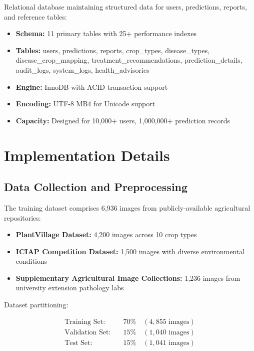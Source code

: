 \documentclass[conference]{IEEEtran}
\begin{document}
Relational database maintaining structured data for users, predictions, reports, and reference tables:

\begin{itemize}
\item \textbf{Schema:} 11 primary tables with 25+ performance indexes
\item \textbf{Tables:} users, predictions, reports, crop\_types, disease\_types, disease\_crop\_mapping, treatment\_recommendations, prediction\_details, audit\_logs, system\_logs, health\_advisories
\item \textbf{Engine:} InnoDB with ACID transaction support
\item \textbf{Encoding:} UTF-8 MB4 for Unicode support
\item \textbf{Capacity:} Designed for 10,000+ users, 1,000,000+ prediction records
\end{itemize}

\section{Implementation Details}
\label{sec:implementation}

\subsection{Data Collection and Preprocessing}

The training dataset comprises 6,936 images from publicly-available agricultural repositories:

\begin{itemize}
\item \textbf{PlantVillage Dataset:} 4,200 images across 10 crop types
\item \textbf{ICIAP Competition Dataset:} 1,500 images with diverse environmental conditions
\item \textbf{Supplementary Agricultural Image Collections:} 1,236 images from university extension pathology labs
\end{itemize}

Dataset partitioning:

\begin{equation}
\begin{aligned}
\text{Training Set:} & \quad 70\% \quad (4,855 \text{ images}) \\
\text{Validation Set:} & \quad 15\% \quad (1,040 \text{ images}) \\
\text{Test Set:} & \quad 15\% \quad (1,041 \text{ images})
\end{aligned}
\end{equation}
\end{document}
